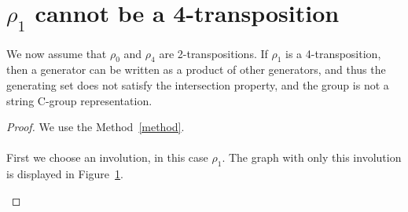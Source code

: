 \section{$\rho_1$ cannot be a 4-transposition}

\begin{lemma}
  \label{exclude-1}
  We now assume that $\rho_0$ and $\rho_4$ are 2-transpositions.
  If $\rho_1$ is a 4-transposition, then a generator can be written as a product of other generators, and thus the generating set does not satisfy the intersection property, and the group is not a string C-group representation.
\end{lemma}

\begin{proof}
We use the Method~\ref{method}.

\paragraph{}
First we choose an involution, in this case $\rho_1$. The graph with only this involution is displayed in Figure~\ref{proof-5-1}.

\begin{figure}[H]
  \begin{center}
    \caption{}
    \label{proof-5-1}
  \end{center}
\end{figure}


\end{proof}
